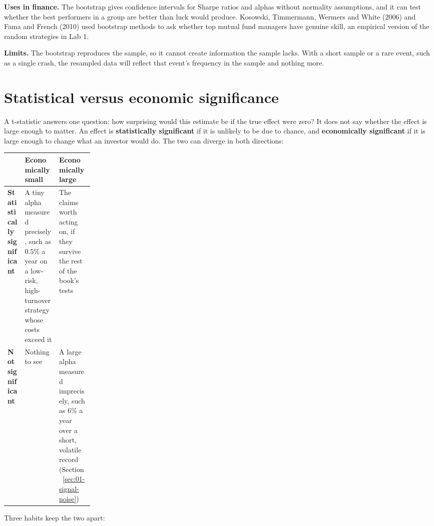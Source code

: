 \textbf{Uses in finance.} The bootstrap gives confidence intervals for Sharpe ratios and alphas without normality assumptions, and it can test whether the best performers in a group are better than luck would produce. Kosowski, Timmermann, Wermers and White (2006) and Fama and French (2010) used bootstrap methods to ask whether top mutual fund managers have genuine skill, an empirical version of the random strategies in Lab 1.

\textbf{Limits.} The bootstrap reproduces the sample, so it cannot create information the sample lacks. With a short sample or a rare event, such as a single crash, the resampled data will reflect that event's frequency in the sample and nothing more.

\section{Statistical versus economic significance}
\label{sec:03-economic}

A t-statistic answers one question: how surprising would this estimate be if the true effect were zero? It does not say whether the effect is large enough to matter. An effect is \textbf{statistically significant} if it is unlikely to be due to chance, and \textbf{economically significant} if it is large enough to change what an investor would do. The two can diverge in both directions:

\begin{center}
\small
\begin{tabularx}{0.9\linewidth}{@{}>{\raggedright\arraybackslash}p{0.20\linewidth}>{\raggedright\arraybackslash}X>{\raggedright\arraybackslash}X@{}}
\toprule
 & Economically small & Economically large \\
\midrule
\textbf{Statistically significant} & A tiny alpha measured precisely, such as 0.5\% a year on a low-risk, high-turnover strategy whose costs exceed it & The claims worth acting on, if they survive the rest of the book's tests \\
\textbf{Not significant} & Nothing to see & A large alpha measured imprecisely, such as 6\% a year over a short, volatile record (Section~\ref{sec:01-signal-noise}) \\
\bottomrule
\end{tabularx}
\end{center}

Three habits keep the two apart:

